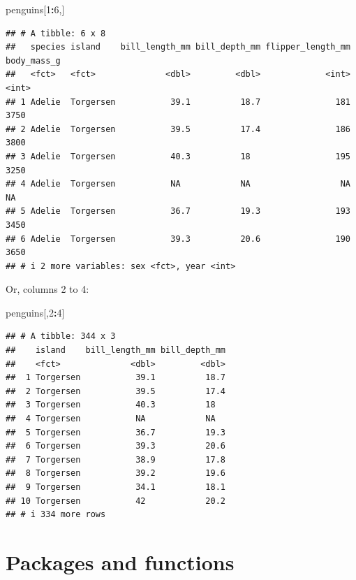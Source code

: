 \documentclass[
]{book}
\newenvironment{Shaded}{\begin{snugshade}}{\end{snugshade}}
\newcommand{\DecValTok}[1]{\textcolor[rgb]{0.00,0.00,0.81}{#1}}
\newcommand{\NormalTok}[1]{#1}
\newcommand{\SpecialCharTok}[1]{\textcolor[rgb]{0.81,0.36,0.00}{\textbf{#1}}}
\begin{document}
\begin{Shaded}
\begin{Highlighting}[]
\NormalTok{penguins[}\DecValTok{1}\SpecialCharTok{:}\DecValTok{6}\NormalTok{,]}
\end{Highlighting}
\end{Shaded}

\begin{verbatim}
## # A tibble: 6 x 8
##   species island    bill_length_mm bill_depth_mm flipper_length_mm body_mass_g
##   <fct>   <fct>              <dbl>         <dbl>             <int>       <int>
## 1 Adelie  Torgersen           39.1          18.7               181        3750
## 2 Adelie  Torgersen           39.5          17.4               186        3800
## 3 Adelie  Torgersen           40.3          18                 195        3250
## 4 Adelie  Torgersen           NA            NA                  NA          NA
## 5 Adelie  Torgersen           36.7          19.3               193        3450
## 6 Adelie  Torgersen           39.3          20.6               190        3650
## # i 2 more variables: sex <fct>, year <int>
\end{verbatim}

Or, columns 2 to 4:

\begin{Shaded}
\begin{Highlighting}[]
\NormalTok{penguins[,}\DecValTok{2}\SpecialCharTok{:}\DecValTok{4}\NormalTok{]}
\end{Highlighting}
\end{Shaded}

\begin{verbatim}
## # A tibble: 344 x 3
##    island    bill_length_mm bill_depth_mm
##    <fct>              <dbl>         <dbl>
##  1 Torgersen           39.1          18.7
##  2 Torgersen           39.5          17.4
##  3 Torgersen           40.3          18  
##  4 Torgersen           NA            NA  
##  5 Torgersen           36.7          19.3
##  6 Torgersen           39.3          20.6
##  7 Torgersen           38.9          17.8
##  8 Torgersen           39.2          19.6
##  9 Torgersen           34.1          18.1
## 10 Torgersen           42            20.2
## # i 334 more rows
\end{verbatim}

\section{Packages and functions}\label{packages-and-functions}
\end{document}

